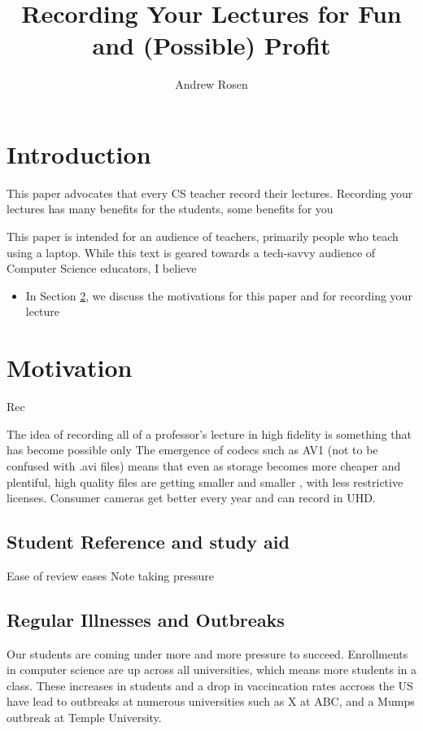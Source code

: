 \documentclass[sigconf]{acmart}
\title{Recording Your Lectures for Fun and (Possible) Profit}
\author{Andrew Rosen}
\affiliation{\institution{Temple University}}
\begin{document}
\maketitle



\section{Introduction}


This paper advocates that every CS teacher record their lectures.
Recording your lectures has many benefits for the students, some benefits for you \cite{Nobody06}

This paper is intended for an audience of teachers, primarily people who teach using a laptop.
While this text is geared towards a tech-savvy audience of Computer Science educators, I believe 




\begin{itemize}
	\item In Section \ref{why}, we discuss the motivations for this paper and for recording your lecture
\end{itemize}
\section{Motivation}
\label{why}
Rec


The idea of recording all of a professor's lecture in high fidelity is something that has become possible only 
The emergence of codecs such as AV1 (not to be confused with .avi files) means that even as storage becomes more cheaper and plentiful, high quality files are getting smaller and smaller \cite{AV1comp}, with less restrictive licenses. 
Consumer cameras get better every year and can record in UHD.


\subsection{Student Reference and study aid}


Ease of review
eases Note taking pressure

\subsection{Regular Illnesses and Outbreaks}
Our students are coming under more and more pressure to succeed.  
Enrollments in computer science are up across all universities, which means more students in a class. 
These increases in students and a drop in vaccincation rates accross the US have lead to outbreaks at numerous universities such as X at ABC, and a Mumps outbreak at Temple University.
\end{document}
